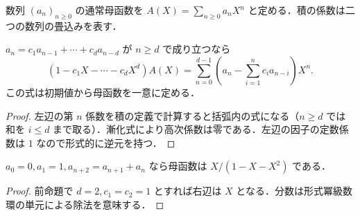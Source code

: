 \begin{defn}[通常母函数]
数列 $(a_n)_{n\geq0}$ の通常母函数を $A(X)=\sum_{n\geq0}a_nX^n$ と定める．積の係数は二つの数列の畳込みを表す．
\end{defn}
\begin{prop}[線形漸化式の母函数]
$a_n=c_1a_{n-1}+\cdots+c_da_{n-d}$ が $n\geq d$ で成り立つなら
\[
(1-c_1X-\cdots-c_dX^d)A(X)=\sum_{n=0}^{d-1}(a_n-\sum_{i=1}^{n}c_i a_{n-i})X^n .
\]
この式は初期値から母函数を一意に定める．
\end{prop}
\begin{proof}
左辺の第 $n$ 係数を積の定義で計算すると括弧内の式になる（$n\geq d$ では和を $i\leq d$ まで取る）．漸化式により高次係数は零である．左辺の因子の定数係数は $1$ なので形式的に逆元を持つ．
\end{proof}
\begin{prop}[Fibonacci数の母函数]
$a_0=0,a_1=1,a_{n+2}=a_{n+1}+a_n$ なら母函数は $X/(1-X-X^2)$ である．
\end{prop}
\begin{proof}
前命題で $d=2,c_1=c_2=1$ とすれば右辺は $X$ となる．分数は形式冪級数環の単元による除法を意味する．
\end{proof}
